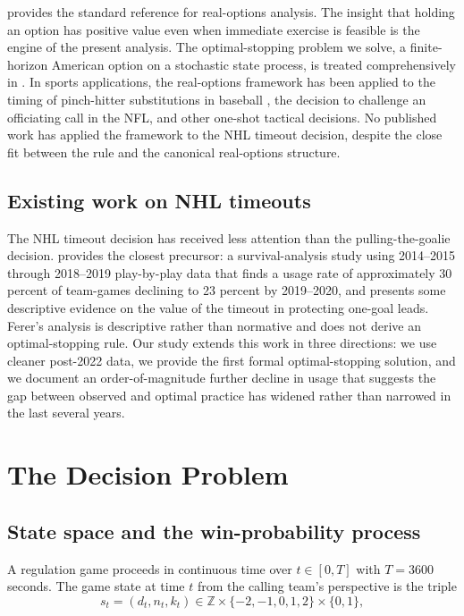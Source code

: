 \documentclass[11pt]{article}
\begin{document}
\citet{DixitPindyck1994} provides the standard reference for real-options analysis. The insight that holding an option has positive value even when immediate exercise is feasible is the engine of the present analysis. The optimal-stopping problem we solve, a finite-horizon American option on a stochastic state process, is treated comprehensively in \citet{KaratzasShreve1998}. In sports applications, the real-options framework has been applied to the timing of pinch-hitter substitutions in baseball \citep{Albert2010}, the decision to challenge an officiating call in the NFL, and other one-shot tactical decisions. No published work has applied the framework to the NHL timeout decision, despite the close fit between the rule and the canonical real-options structure.

\subsection{Existing work on NHL timeouts}

The NHL timeout decision has received less attention than the pulling-the-goalie decision. \citet{Ferer2020} provides the closest precursor: a survival-analysis study using 2014--2015 through 2018--2019 play-by-play data that finds a usage rate of approximately 30 percent of team-games declining to 23 percent by 2019--2020, and presents some descriptive evidence on the value of the timeout in protecting one-goal leads. Ferer's analysis is descriptive rather than normative and does not derive an optimal-stopping rule. Our study extends this work in three directions: we use cleaner post-2022 data, we provide the first formal optimal-stopping solution, and we document an order-of-magnitude further decline in usage that suggests the gap between observed and optimal practice has widened rather than narrowed in the last several years.

\section{The Decision Problem}\label{sec:theory}

\subsection{State space and the win-probability process}

A regulation game proceeds in continuous time over $t \in [0, T]$ with $T = 3600$ seconds. The game state at time $t$ from the calling team's perspective is the triple
\begin{equation}
s_t = (d_t, n_t, k_t) \in \mathbb{Z} \times \{-2, -1, 0, 1, 2\} \times \{0, 1\},
\end{equation}
\end{document}
